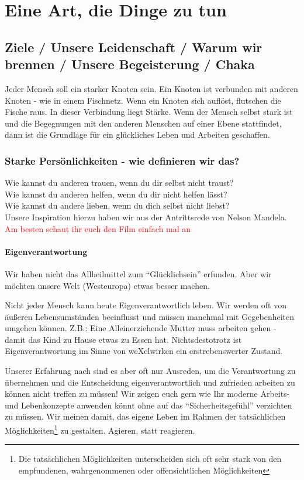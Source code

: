 \chapter{Eine Art, die Dinge zu tun}
  \section{Ziele / Unsere Leidenschaft / Warum wir brennen / Unsere Begeisterung / Chaka}
Jeder Mensch soll ein starker Knoten sein. Ein Knoten ist verbunden mit anderen Knoten - wie in einem Fischnetz. Wenn ein Knoten sich auflöst, flutschen die Fische raus.
%
In dieser Verbindung liegt Stärke.
%
Wenn der Mensch selbst stark ist und die Begegnungen mit den anderen Menschen auf einer Ebene stattfindet, dann ist die Grundlage für ein glückliches Leben und Arbeiten geschaffen.
    \subsection{Starke Persönlichkeiten - wie definieren wir das?}
Wie kannst du anderen trauen, wenn du dir selbst nicht traust?\\
Wie kannst du anderen helfen, wenn du dir nicht helfen lässt?\\
Wie kannst du andere lieben, wenn du dich selbst nicht liebst?\\

Unsere Inspiration hierzu haben wir aus der Antrittsrede von Nelson Mandela.
\textcolor{red}{Am besten schaut ihr euch den Film einfach mal an}



      \subsubsection {Eigenverantwortung}
Wir haben nicht das Allheilmittel zum "`Glücklichsein"' erfunden. Aber wir möchten unsere Welt (Westeuropa) etwas besser machen.



Nicht jeder Mensch kann heute Eigenverantwortlich leben. Wir werden oft von äußeren Lebensumständen beeinflusst und müssen manchmal mit Gegebenheiten umgehen können. Z.B.: Eine Alleinerziehende Mutter muss arbeiten gehen - damit das Kind zu Hause etwas zu Essen hat. 
%
Nichtsdestotrotz ist Eigenverantwortung im Sinne von weXelwirken ein erstrebenswerter Zustand.


Unserer Erfahrung nach sind es aber oft nur Ausreden, um die Verantwortung zu übernehmen und die Entscheidung eigenverantwortlich und zufrieden arbeiten zu können nicht treffen zu müssen! Wir zeigen euch gern wie Ihr moderne Arbeits- und Lebenkonzepte anwenden könnt ohne auf das "`Sicherheitsgefühl"' verzichten zu müssen.
%
Wir meinen damit, das eigene Leben im Rahmen der tatsächlichen Möglichkeiten\footnote{Die tatsächlichen Möglichkeiten unterscheiden sich oft sehr stark von den empfundenen, wahrgenommenen oder offensichtlichen Möglichkeiten} zu gestalten.
%
Agieren, statt reagieren.



